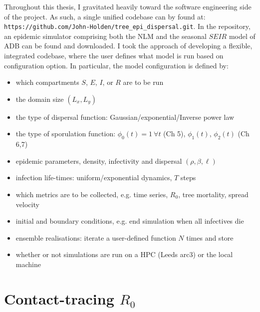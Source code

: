 Throughout this thesis, I gravitated heavily toward the software engineering side of the project. 
As such, a single unified codebase can by found at: \nolinkurl{https://github.com/John-Holden/tree_epi_dispersal.git}.
In the repository, an epidemic simulator comprising both the NLM and the seasonal $SEIR$ model of ADB can be found and downloaded.
I took the approach of developing a flexible, integrated codebase, where the user defines what model is run based on configuration option.
In particular, the model configuration is defined by:
\begin{itemize}
    \item which compartments $S$, $E$, $I$, or $R$ are to be run
    \item the domain size $(L_x, L_y)$
    \item the type of dispersal function: Gaussian/exponential/Inverse power law
    \item the type of sporulation function: $\phi_0(t) = 1 \ \forall t$ (Ch 5), $\phi_1(t)$, $\phi_2(t)$ (Ch 6,7)
    \item epidemic parameters, density, infectivity and dispersal $(\rho, \beta, \ell)$
    \item infection life-times: uniform/exponential dynamics, $T$ steps
    \item which metrics are to be collected, e.g. time series, $R_0$, tree mortality, spread velocity
    \item initial and boundary conditions, e.g. end simulation when all infectives die 
    \item ensemble realisations: iterate a user-defined function $N$ times and store
    \item whether or not simulations are run on a HPC (Leeds arc3) or the local machine
\end{itemize}

\section{Contact-tracing $R_0$}
\label{A:R0-contact-traced-mortality}

